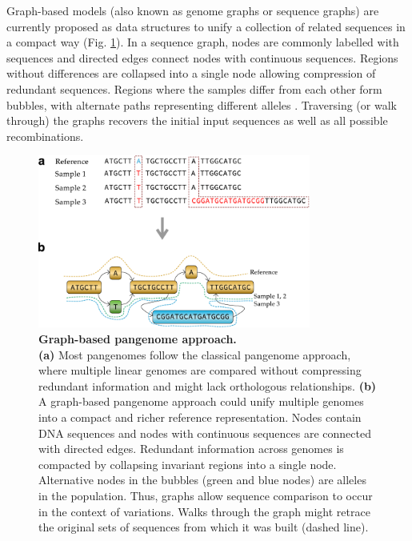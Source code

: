 \documentclass[../main.tex]{subfiles}
\begin{document}
Graph-based models (also known as genome graphs or sequence graphs) are currently proposed as data structures to unify a collection of related sequences in a compact way (Fig. \ref{fig14:graph}). In a sequence graph, nodes are commonly labelled with sequences and directed edges connect nodes with continuous sequences. Regions without differences are collapsed into a single node allowing compression of redundant sequences. Regions where the samples differ from each other form bubbles, with alternate paths representing different alleles \citep{paten2018superbubbles}. Traversing (or walk through) the graphs recovers the initial input sequences as well as all possible recombinations. \\


\begin{figure}[!htb]
    \centering
    \includegraphics[width=0.8\textwidth]{intro/fig4.pdf}
        \vspace{3mm}
        \caption[Graph-based pangenome approach]{\textbf{Graph-based pangenome approach.} \\
        \footnotesize{\textbf{(a)} Most pangenomes follow the classical pangenome approach, where multiple linear genomes are compared without compressing redundant information and might lack orthologous relationships. \textbf{(b)} A graph-based pangenome approach could unify multiple genomes into a compact and richer reference representation. Nodes contain DNA sequences and nodes with continuous sequences are connected with directed edges. Redundant information across genomes is compacted by collapsing invariant regions into a single node. Alternative nodes in the bubbles (green and blue nodes) are alleles in the population. Thus, graphs allow sequence comparison to occur in the context of variations. Walks through the graph might retrace the original sets of sequences from which it was built (dashed line).}}
        \label{fig14:graph}
\end{figure}
\end{document}
